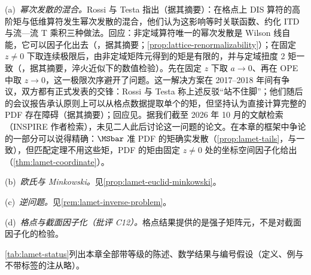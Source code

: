 \begin{remark}[批评与回应]\label{rem:lattice-critiques}
(a)~\emph{幂次发散的混合。}Rossi 与 Testa 指出（据其摘要）\cite{Rossi:2017muf,Rossi:2018zkn}：在格点上 DIS 算符的高阶矩与低维算符发生幂次发散的混合，他们认为这影响等时关联函数、约化 ITD 与流—流 T 乘积三种做法。回应：非定域算符唯一的幂次发散是 Wilson 线自能，它可以因子化出去（\cite{Ji:2017rah}，据其摘要；\cref{prop:lattice-renormalizability}）；在固定 $z\neq0$ 下取连续极限后，由非定域矩阵元得到的矩是有限的，并与定域扭度 2 矩一致（\cite{Karpie:2018zaz}，据其摘要，淬火近似下的数值检验）。先在固定 $z$ 下取 $a\to0$、再在 OPE 中取 $z\to0$，这一极限次序避开了问题。这一解决方案在 2017--2018 年间有争议，双方都有正式发表的交锋：Rossi 与 Testa 称上述反驳“站不住脚”\cite[第~3.1~节]{Rossi:2018zkn}；他们随后的会议报告承认原则上可以从格点数据提取单个的矩，但坚持认为直接计算完整的 PDF 存在障碍\cite{Rossi:2018stq}（据其摘要）；回应见\cite{Karpie:2018zaz,Radyushkin:2018nbf}。据我们截至 2026 年 10 月的文献检索（INSPIRE 作者检索），未见二人此后讨论这一问题的论文。在本章的框架中争论的一部分可以说得精确：$\MSbar$ 准 PDF 的矩确实发散（\cref{prop:lamet-tails}，与\cite{Radyushkin:2018nbf}一致），但匹配定理不用这些矩，PDF 的矩由固定 $z\neq0$ 处的坐标空间因子化给出（\cref{thm:lamet-coordinate}）。

(b)~\emph{欧氏与 Minkowski。}见\cref{prop:lamet-euclid-minkowski}。

(c)~\emph{逆问题。}见\cref{rem:lamet-inverse-problem}。

(d)~\emph{格点与截面因子化（批评 C12）。}格点结果提供的是强子矩阵元，不是对截面因子化的检验。
\end{remark}

\cref{tab:lamet-status}列出本章全部带等级的陈述、数学结果与编号假设（定义、例与不带标签的注从略）。

